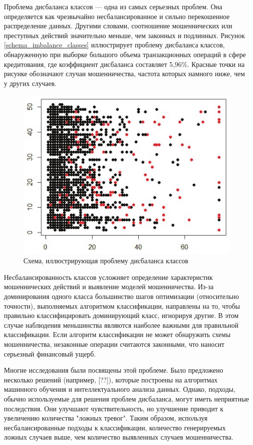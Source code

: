 \documentclass[12pt]{report}
\begin{document}
	Проблема дисбаланса классов — одна из самых серьезных проблем. Она определяется как чрезвычайно несбалансированное и сильно перекошенное распределение данных. Другими словами, соотношение мошеннических или преступных действий значительно меньше, чем законных и подлинных. Рисунок \ref{schema_imbalance_classes} иллюстрирует проблему дисбаланса классов, обнаруженную при выборке большого объема транзакционных операций в сфере кредитования, где коэффициент дисбаланса составляет 5,96\%. Красные точки на рисунке обозначают случаи мошенничества, частота которых намного ниже, чем у других случаев.
	
	\begin{figure}[H]
		\centering
		\includegraphics[width=0.8\linewidth]{imbalance_classes}
		\caption{Схема, иллюстрирующая проблему дисбаланса классов}
		\label{fig:schema_imbalance_classes}
	\end{figure}
	
	Несбалансированность классов усложняет определение характеристик мошеннических действий и выявление моделей мошенничества. Из-за доминирования одного класса большинство шагов оптимизации (относительно точности), выполняемых алгоритмом классификации, направлены на то, чтобы правильно классифицировать доминирующий класс, игнорируя другие. В этом случае наблюдения меньшинства являются наиболее важными для правильной классификации. Если алгоритм классификации не может обнаружить схемы мошенничества, незаконные операции считаются законными, что наносит серьезный финансовый ущерб.
	
	Многие исследования были посвящены этой проблеме. Было предложено несколько решений (например, [??]), которые построены на алгоритмах машинного обучения и интеллектуального анализа данных. Однако, подходы, обычно используемые для решения проблем дисбаланса, могут иметь неприятные последствия. Они улучшают чувствительность, но улучшение приводит к увеличению количества "ложных тревог". Таким образом, используя несбалансированные подходы к классификации, количество генерируемых ложных случаев выше, чем количество выявленных случаев мошенничества.
	
\end{document}
